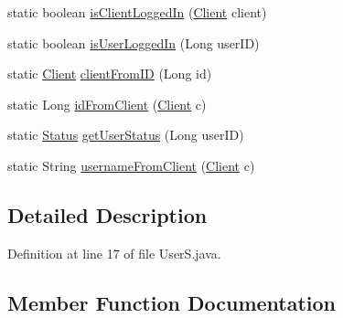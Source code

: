 \begin{DoxyCompactItemize}
\item 
static boolean \hyperlink{classpt_1_1up_1_1fe_1_1lpro1613_1_1server_1_1logic_1_1_user_s_abe3cf61bff09cb09e3ed0a5564e98257}{is\+Client\+Logged\+In} (\hyperlink{classpt_1_1up_1_1fe_1_1lpro1613_1_1server_1_1conn_1_1_client}{Client} client)
\item 
static boolean \hyperlink{classpt_1_1up_1_1fe_1_1lpro1613_1_1server_1_1logic_1_1_user_s_af0725775fa11525afa9299d198d69b2a}{is\+User\+Logged\+In} (Long user\+ID)
\item 
static \hyperlink{classpt_1_1up_1_1fe_1_1lpro1613_1_1server_1_1conn_1_1_client}{Client} \hyperlink{classpt_1_1up_1_1fe_1_1lpro1613_1_1server_1_1logic_1_1_user_s_ac189b4e10d166dd53fb0e135c9565fbc}{client\+From\+ID} (Long id)
\item 
static Long \hyperlink{classpt_1_1up_1_1fe_1_1lpro1613_1_1server_1_1logic_1_1_user_s_a6ce47ad78e634c757be0ffc905799b4c}{id\+From\+Client} (\hyperlink{classpt_1_1up_1_1fe_1_1lpro1613_1_1server_1_1conn_1_1_client}{Client} c)
\item 
static \hyperlink{enumpt_1_1up_1_1fe_1_1lpro1613_1_1sharedlib_1_1tuples_1_1_user_info_1_1_status}{Status} \hyperlink{classpt_1_1up_1_1fe_1_1lpro1613_1_1server_1_1logic_1_1_user_s_a92958d5006bbce1dbc15722f801d67ef}{get\+User\+Status} (Long user\+ID)
\item 
static String \hyperlink{classpt_1_1up_1_1fe_1_1lpro1613_1_1server_1_1logic_1_1_user_s_a26c28666f4e6461ee06eecfe1f55356d}{username\+From\+Client} (\hyperlink{classpt_1_1up_1_1fe_1_1lpro1613_1_1server_1_1conn_1_1_client}{Client} c)
\end{DoxyCompactItemize}


\subsection{Detailed Description}


Definition at line 17 of file User\+S.\+java.



\subsection{Member Function Documentation}
\hypertarget{classpt_1_1up_1_1fe_1_1lpro1613_1_1server_1_1logic_1_1_user_s_afca9c18f164a1006c2411b8e283ec4fb}{}\label{classpt_1_1up_1_1fe_1_1lpro1613_1_1server_1_1logic_1_1_user_s_afca9c18f164a1006c2411b8e283ec4fb} 
